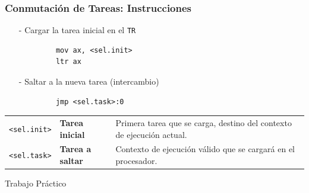 \documentclass[aspectratio=169]{beamer}
\begin{document}
\begin{frame}[fragile]
    \frametitle{Conmutaci\'on de Tareas: Instrucciones}
    \begin{itemize}
        \item[-] Cargar la tarea inicial en el \verb|TR|
    \end{itemize}
    \begin{verbatim}
            mov ax, <sel.init>
            ltr ax
    \end{verbatim}
    \pause
    \begin{itemize}
        \item[-] Saltar a la nueva tarea (intercambio)
    \end{itemize}
    \begin{verbatim}
            jmp <sel.task>:0
    \end{verbatim}
    \pause
    \vspace{0.5cm}
    \begin{tabular}{l|l|l}
    \texttt{<sel.init>} & \small \textbf{Tarea inicial}  & \small Primera tarea que se carga, destino del contexto de ejecución actual.\\
    \texttt{<sel.task>} & \small \textbf{Tarea a saltar} & \small Contexto de ejecución válido que se cargará en el procesador.\\
    \end{tabular}
\end{frame}

\begin{frame}[plain]
\Huge \textcolor{naranjauca}{Trabajo Práctico}
\end{frame}
\end{document}
